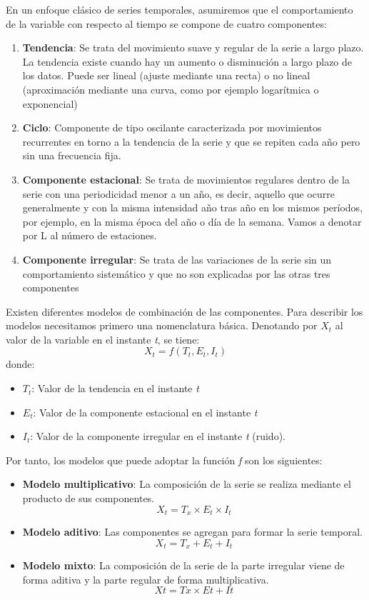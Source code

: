 \documentclass[12pt,a4paper,]{book}
\providecommand{\tightlist}{%
  \setlength{\itemsep}{0pt}\setlength{\parskip}{0pt}}
\numberwithin{dummy}{section}
\theoremstyle{ocrenumbox}
\theoremstyle{blacknumex}
\theoremstyle{blacknumbox}
\theoremstyle{ocrenum}
\theoremstyle{ocrenum}
\begin{document}
En un enfoque clásico de series temporales, asumiremos que el
comportamiento de la variable con respecto al tiempo se compone de
cuatro componentes:

\begin{enumerate}
\def\labelenumi{\arabic{enumi}.}
\item
  \textbf{Tendencia}: Se trata del movimiento suave y regular de la
  serie a largo plazo. La tendencia existe cuando hay un aumento o
  disminución a largo plazo de los datos. Puede ser lineal (ajuste
  mediante una recta) o no lineal (aproximación mediante una curva, como
  por ejemplo logarítmica o exponencial)
\item
  \textbf{Ciclo}: Componente de tipo oscilante caracterizada por
  movimientos recurrentes en torno a la tendencia de la serie y que se
  repiten cada año pero sin una frecuencia fija.
\item
  \textbf{Componente estacional}: Se trata de movimientos regulares
  dentro de la serie con una periodicidad menor a un año, es decir,
  aquello que ocurre generalmente y con la misma intensidad año tras año
  en los mismos períodos, por ejemplo, en la misma época del año o día
  de la semana. Vamos a denotar por L al número de estaciones.
\item
  \textbf{Componente irregular}: Se trata de las variaciones de la serie
  sin un comportamiento sistemático y que no son explicadas por las
  otras tres componentes
\end{enumerate}

Existen diferentes modelos de combinación de las componentes. Para
describir los modelos necesitamos primero una nomenclatura básica.
Denotando por \(X_t\) al valor de la variable en el instante \emph{t},
se tiene: \[ X_t = f(T_t,E_t,I_t)\] donde:

\begin{itemize}
\tightlist
\item
  \(T_t\): Valor de la tendencia en el instante \emph{t}
\item
  \(E_t\): Valor de la componente estacional en el instante \emph{t}
\item
  \(I_t\): Valor de la componente irregular en el instante \emph{t}
  (ruido).
\end{itemize}

Por tanto, los modelos que puede adoptar la función \emph{f} son los
siguientes:

\begin{itemize}
\tightlist
\item
  \textbf{Modelo multiplicativo}: La composición de la serie se realiza
  mediante el producto de sus componentes.
  \[X_t = T_x \times E_t \times I_t\]
\item
  \textbf{Modelo aditivo}: Las componentes se agregan para formar la
  serie temporal. \[X_t = T_x + E_t + I_t\]
\item
  \textbf{Modelo mixto}: La composición de la serie de la parte
  irregular viene de forma aditiva y la parte regular de forma
  multiplicativa. \[Xt=Tx \times Et + It\]
\end{itemize}
\end{document}
